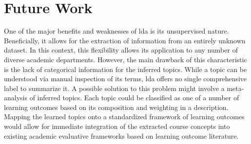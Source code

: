 \section{Future Work}
\label{sec:future-work}


One of the major benefits and weaknesses of \ac{lda} is its unsupervised nature.
Beneficially, it allows for the extraction of information from an entirely unknown dataset.
In this context, this flexibility allows its application to any number of diverse academic departments.
However, the main drawback of this characteristic is the lack of categorical information for the inferred topics.
While a topic can be understood via manual inspection of its terms, \ac{lda} offers no single comprehensive label to summarize it.
A possible solution to this problem might involve a meta-analysis of inferred topics.
Each topic could be classified as one of a number of learning outcomes based on its composition and weighting in a description.
Mapping the learned topics onto a standardized framework of learning outcomes~\cite{krathwohl2002} would allow for immediate integration of the extracted course concepts into existing academic evaluative frameworks based on learning outcome literature.


